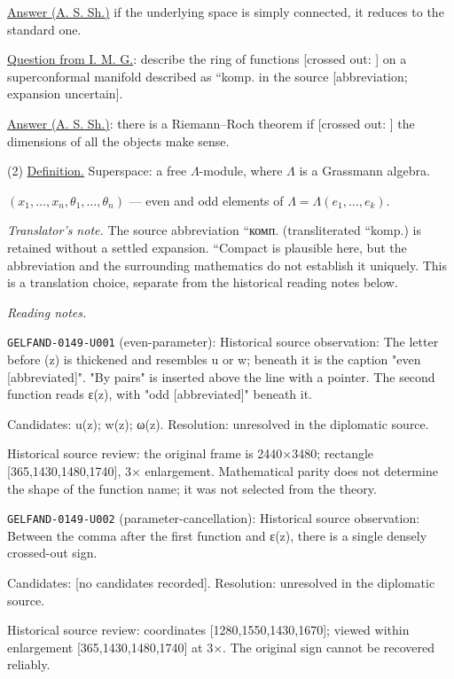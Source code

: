 \underline{Answer (A. S. Sh.)} if the underlying space is simply connected, it reduces to the standard one.

\underline{Question from I. M. G.}: describe the ring of functions
[crossed out: ]
on a superconformal manifold described as ``komp. in the source [abbreviation; expansion uncertain].

\underline{Answer (A. S. Sh.)}: there is a Riemann--Roch theorem if
[crossed out: ]
the dimensions of all the objects make sense.

(2) \underline{Definition.} Superspace: a free $\Lambda$-module, where $\Lambda$ is a Grassmann algebra.

$(x_1,\ldots,x_n,\theta_1,\ldots,\theta_n)$ --- even and odd elements of
$\Lambda=\Lambda(e_1,\ldots,e_k)$.


\par\smallskip\noindent\textit{Translator's note.} The source abbreviation ``комп. (transliterated ``komp.) is retained without a settled expansion. ``Compact is plausible here, but the abbreviation and the surrounding mathematics do not establish it uniquely. This is a translation choice, separate from the historical reading notes below.\par

\par\smallskip\noindent\textit{Reading notes.}\par
\noindent\texttt{GELFAND-0149-U001} (even-parameter): Historical source observation: The letter before (z) is thickened and resembles u or w; beneath it is the caption "even [abbreviated]". "By pairs" is inserted above the line with a pointer. The second function reads ε(z), with "odd [abbreviated]" beneath it.\par
Candidates: u(z); w(z); ω(z). Resolution: unresolved in the diplomatic source.\par
Historical source review: the original frame is 2440×3480; rectangle [365,1430,1480,1740], 3× enlargement. Mathematical parity does not determine the shape of the function name; it was not selected from the theory.\par

\noindent\texttt{GELFAND-0149-U002} (parameter-cancellation): Historical source observation: Between the comma after the first function and ε(z), there is a single densely crossed-out sign.\par
Candidates: [no candidates recorded]. Resolution: unresolved in the diplomatic source.\par
Historical source review: coordinates [1280,1550,1430,1670]; viewed within enlargement [365,1430,1480,1740] at 3×. The original sign cannot be recovered reliably.\par

